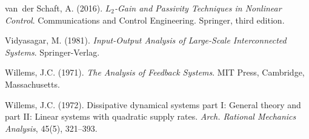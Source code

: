 \documentclass{ifacconf}
\theoremstyle{definition}
\begin{document}
\begin{thebibliography}{12}
van~der Schaft, A. (2016).
\newblock \emph{$L_2$-Gain and Passivity Techniques in Nonlinear Control}.
\newblock Communications and Control Engineering. Springer, third edition.

Vidyasagar, M. (1981).
\newblock \emph{Input-Output Analysis of Large-Scale Interconnected Systems}.
\newblock Springer-Verlag.

Willems, J.C. (1971).
\newblock \emph{The Analysis of Feedback Systems}.
\newblock MIT Press, Cambridge, Massachusetts.

Willems, J.C. (1972).
\newblock Dissipative dynamical systems part {I}: General theory and part {II}:
  Linear systems with quadratic supply rates.
\newblock \emph{Arch. Rational Mechanics Analysis}, 45(5), 321--393.

\end{thebibliography}
\end{document}

